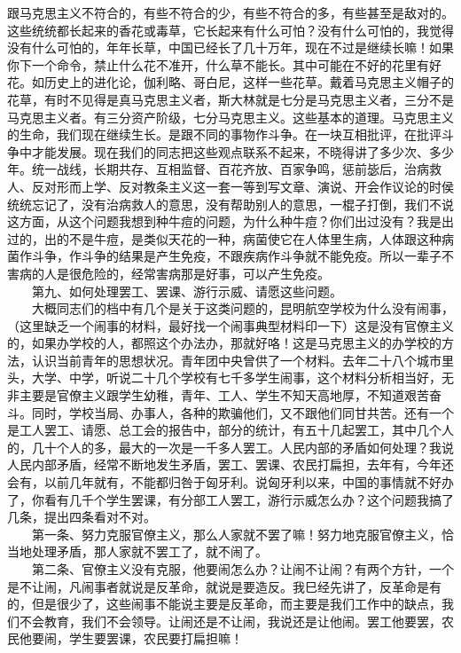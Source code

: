 \documentclass[cn,11pt,chinese]{elegantbook}
\begin{document}
跟马克思主义不符合的，有些不符合的少，有些不符合的多，有些甚至是敌对的。这些统统都长起来的香花或毒草，它长起来有什么可怕？没有什么可怕的，我觉得没有什么可怕的，年年长草，中国已经长了几十万年，现在不过是继续长嘛！如果你下一个命令，禁止什么花不准开，什么草不能长。其中可能在不好的花里有好花。如历史上的进化论，伽利略、哥白尼，这样一些花草。戴着马克思主义帽子的花草，有时不见得是真马克思主义者，斯大林就是七分是马克思主义者，三分不是马克思主义者。有三分资产阶级，七分马克思主义。这些基本的道理。马克思主义的生命，我们现在继续生长。是跟不同的事物作斗争。在一块互相批评，在批评斗争中才能发展。现在我们的同志把这些观点联系不起来，不晓得讲了多少次、多少年。统一战线，长期共存、互相监督、百花齐放、百家争鸣，惩前毖后，治病救人、反对形而上学、反对教条主义这一套一等到写文章、演说、开会作议论的时侯统统忘记了，没有治病救人的意思，没有帮助别人的意思，一棍子打倒，我们不说这方面，从这个问题我想到种牛痘的问题，为什么种牛痘？你们出过没有？我是出过的，出的不是牛痘，是类似天花的一种，病菌使它在人体里生病，人体跟这种病菌作斗争，作斗争的结果是产生免疫，不跟疾病作斗争就不能免疫。所以一辈子不害病的人是很危险的，经常害病那是好事，可以产生免疫。\\
　　第九、如何处理罢工、罢课、游行示威、请愿这些问题。\\
　　大概同志们的档中有几个是关于这类问题的，昆明航空学校为什么没有闹事，（这里缺乏一个闹事的材料，最好找一个闹事典型材料印一下）这是没有官僚主义的，如果办学校的人，都照这个办法办，那就好咯！这是马克思主义的办学校的方法，认识当前青年的思想状况。青年团中央曾供了一个材料。去年二十八个城市里头，大学、中学，听说二十几个学校有七千多学生闹事，这个材料分析相当好，无非主要是官僚主义跟学生幼稚，青年、工人、学生不知天高地厚，不知道艰苦奋斗。同时，学校当局、办事人，各种的欺骗他们，又不跟他们同甘共苦。还有一个是工人罢工、请愿、总工会的报告中，部分的统计，有五十几起罢工，其中几个人的，几十个人的多，最大的一次是一千多人罢工。人民内部的矛盾如何处理？我说人民内部矛盾，经常不断地发生矛盾，罢工、罢课、农民打扁担，去年有，今年还会有，以前几年就有，不能都归咎于匈牙利。说匈牙利以来，中国的事情就不好办了，你看有几千个学生罢课，有分部工人罢工，游行示威怎么办？这个问题我搞了几条，提出四条看对不对。\\
　　第一条、努力克服官僚主义，那么人家就不罢了嘛！努力地克服官僚主义，恰当地处理矛盾，那人家就不罢工了，就不闹了。\\
　　第二条、官僚主义没有克服，他要闹怎么办？让闹不让闹？有两个方针，一个是不让闹，凡闹事者就说是反革命，就说是要造反。我巳经先讲了，反革命是有的，但是很少了，这些闹事不能说主要是反革命，而主要是我们工作中的缺点，我们不会教育，我们不会领导。让闹还是不让闹，我说还是让他闹。罢工他要罢，农民他要闹，学生要罢课，农民要打扁担嘛！\\
\end{document}
